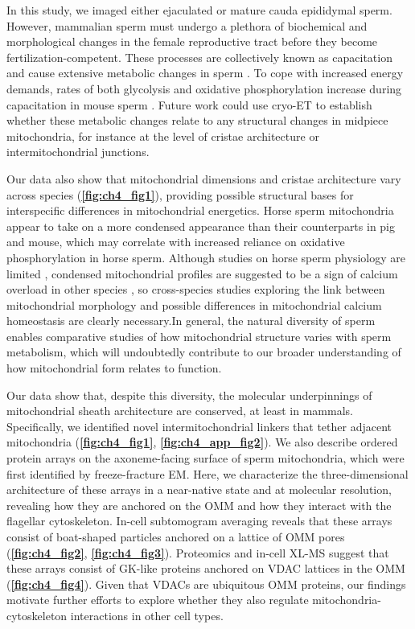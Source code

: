 In this study, we imaged either ejaculated or mature cauda epididymal sperm. However, mammalian sperm must undergo a plethora of biochemical and morphological changes in the female reproductive tract before they become fertilization-competent. These processes are collectively known as capacitation and cause extensive metabolic changes in sperm \cite{Mounib1964}. To cope with increased energy demands, rates of both glycolysis and oxidative phosphorylation increase during capacitation in mouse sperm \cite{Balbach2020}. Future work could use cryo-ET to establish whether these metabolic changes relate to any structural changes in midpiece mitochondria, for instance at the level of cristae architecture or intermitochondrial junctions.

Our data also show that mitochondrial dimensions and cristae architecture vary across species (\textbf{\autoref{fig:ch4_fig1}}), providing possible structural bases for interspecific differences in mitochondrial energetics. Horse sperm mitochondria appear to take on a more condensed appearance than their counterparts in pig and mouse, which may correlate with increased reliance on oxidative phosphorylation in horse sperm. Although studies on horse sperm physiology are limited \cite{Meyers2019}, condensed mitochondrial profiles are suggested to be a sign of calcium overload in other species \cite{Jamil1981, Okunade2004}, so cross-species studies exploring the link between mitochondrial morphology and possible differences in mitochondrial calcium homeostasis are clearly necessary.In general, the natural diversity of sperm enables comparative studies of how mitochondrial structure varies with sperm metabolism, which will undoubtedly contribute to our broader understanding of how mitochondrial form relates to function.

Our data show that, despite this diversity, the molecular underpinnings of mitochondrial sheath architecture are conserved, at least in mammals. Specifically, we identified novel intermitochondrial linkers that tether adjacent mitochondria (\textbf{\autoref{fig:ch4_fig1}}, \textbf{\autoref{fig:ch4_app_fig2}}). We also describe ordered protein arrays on the axoneme-facing surface of sperm mitochondria, which were first identified by freeze-fracture EM. Here, we characterize the three-dimensional architecture of these arrays in a near-native state and at molecular resolution, revealing how they are anchored on the OMM and how they interact with the flagellar  cytoskeleton. In-cell subtomogram averaging reveals that these arrays consist of boat-shaped particles anchored on a lattice of OMM pores (\textbf{\autoref{fig:ch4_fig2}}, \textbf{\autoref{fig:ch4_fig3}}). Proteomics and in-cell XL-MS suggest that these arrays consist of GK-like proteins anchored on VDAC lattices in the OMM (\textbf{\autoref{fig:ch4_fig4}}). Given that VDACs are ubiquitous OMM proteins, our findings motivate further efforts to explore whether they also regulate mitochondria-cytoskeleton interactions in other cell types.

